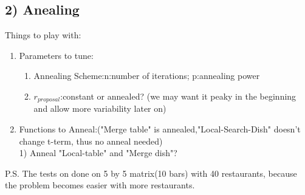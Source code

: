 \documentclass{article}
\begin{document}
\begin{spacing}{1.1}
\section{2) Anealing}
Things to play with:
\begin{enumerate}
 \item Parameters to tune:
\begin{enumerate}
\item Annealing Scheme:n:number of iterations; p:annealing power
\item $r_{proposal}$:constant or annealed? (we may want it peaky in the beginning and allow more variability later on)
\end{enumerate}
\item Functions to Anneal:("Merge table" is annealed,"Local-Search-Dish" doesn't change t-term, thus no anneal needed)\\
1) Anneal "Local-table" and "Merge dish"?
\end{enumerate}
P.S. The tests on done on 5 by 5 matrix(10 bars) with 40 restaurants, because the problem becomes easier with more restaurants.
\newpage

\end{spacing}
\end{document}
